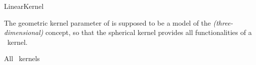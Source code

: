 \begin{ccRefConcept}{LinearKernel} 

\ccDefinition

The geometric kernel parameter of  is
supposed to be a model of the \textit{(three-dimensional)} 
concept, so that the spherical kernel provides all functionalities of a
\cgal\ kernel.





\ccHasModels

All \cgal\ kernels

\ccSeeAlso

\\

\end{ccRefConcept}
